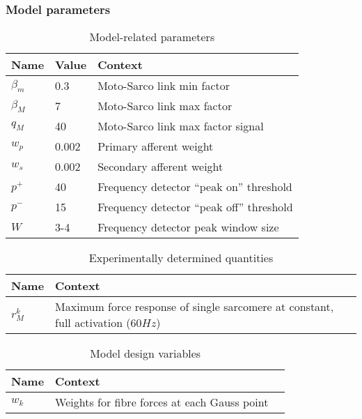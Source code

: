 \subsubsection{Model parameters}
\begin{table}[!ht]
	\begin{tabular}{l|l|l}
		Name & Value & Context\\\hline
		$\beta_m$ & 0.3 & Moto-Sarco link min factor\\
		$\beta_M$ & 7 & Moto-Sarco link max factor\\
		$q_M$ & 40 & Moto-Sarco link max factor signal\\
		$w_p$ & 0.002 & Primary afferent weight\\
		$w_s$ & 0.002 & Secondary afferent weight\\
		$p^+$ & 40 & Frequency detector ``peak on'' threshold\\
		$p^-$ & 15 & Frequency detector ``peak off'' threshold\\
		$W$ & 3-4 & Frequency detector peak window size
	\end{tabular}
	\caption{Model-related parameters}\label{tab:params}
\end{table}
\begin{table}[!ht]
	\begin{tabular}{l|ll}
		Name & Context\\\hline
		$r^k_M$ & Maximum force response of single sarcomere at constant, full activation ($60Hz$) 
	\end{tabular}
	\caption{Experimentally determined quantities}\label{tab:params}
\end{table}
\begin{table}[!ht]
	\begin{tabular}{l|ll}
		Name &  Context\\\hline
		$w_k$ & Weights for fibre forces at each Gauss point  
	\end{tabular}
	\caption{Model design variables}\label{tab:params}
\end{table}


